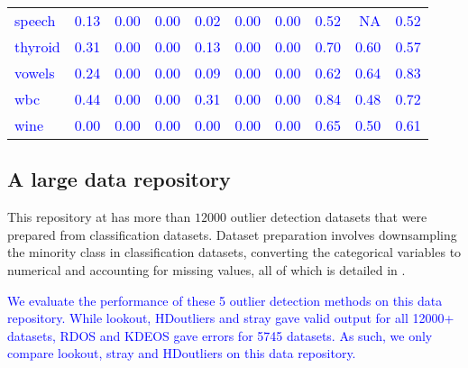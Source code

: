 \documentclass[12pt]{article}
\theoremstyle{definition}
\theoremstyle{definition}
\theoremstyle{definition}
\theoremstyle{remark}
\begin{document}
\begin{table}
\begin{tabular}[t]{lrrrrrrrrr}
\textcolor{blue}{speech} & \textcolor{blue}{0.13} & \textcolor{blue}{0.00} & \textcolor{blue}{0.00} & \textcolor{blue}{0.02} & \textcolor{blue}{0.00} & \textcolor{blue}{0.00} & \textcolor{blue}{0.52} & \textcolor{blue}{NA} & \textcolor{blue}{0.52}\\
\textcolor{blue}{thyroid} & \textcolor{blue}{0.31} & \textcolor{blue}{0.00} & \textcolor{blue}{0.00} & \textcolor{blue}{0.13} & \textcolor{blue}{0.00} & \textcolor{blue}{0.00} & \textcolor{blue}{0.70} & \textcolor{blue}{0.60} & \textcolor{blue}{0.57}\\
\textcolor{blue}{vowels} & \textcolor{blue}{0.24} & \textcolor{blue}{0.00} & \textcolor{blue}{0.00} & \textcolor{blue}{0.09} & \textcolor{blue}{0.00} & \textcolor{blue}{0.00} & \textcolor{blue}{0.62} & \textcolor{blue}{0.64} & \textcolor{blue}{0.83}\\
\addlinespace
\textcolor{blue}{wbc} & \textcolor{blue}{0.44} & \textcolor{blue}{0.00} & \textcolor{blue}{0.00} & \textcolor{blue}{0.31} & \textcolor{blue}{0.00} & \textcolor{blue}{0.00} & \textcolor{blue}{0.84} & \textcolor{blue}{0.48} & \textcolor{blue}{0.72}\\
\textcolor{blue}{wine} & \textcolor{blue}{0.00} & \textcolor{blue}{0.00} & \textcolor{blue}{0.00} & \textcolor{blue}{0.00} & \textcolor{blue}{0.00} & \textcolor{blue}{0.00} & \textcolor{blue}{0.65} & \textcolor{blue}{0.50} & \textcolor{blue}{0.61}\\
\bottomrule
\end{tabular}
\end{table}

\hypertarget{a-large-data-repository}{%
\subsection{A large data repository}\label{a-large-data-repository}}

This repository at \citet{datasets} has more than \(12000\) outlier detection datasets that were prepared from classification datasets. Dataset preparation involves downsampling the minority class in classification datasets, converting the categorical variables to numerical and accounting for missing values, all of which is detailed in \citet{normalizationoutliers}.

\textcolor{blue}{ We evaluate the performance of these 5 outlier detection methods on this data repository. While lookout, HDoutliers and stray gave valid output for all 12000+ datasets, RDOS and KDEOS gave errors for 5745 datasets. As such, we only compare lookout, stray and HDoutliers on this data repository.}
\end{document}
